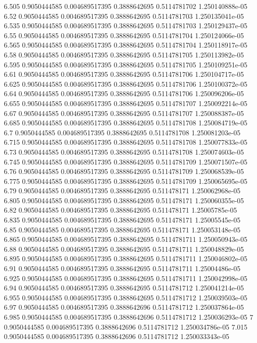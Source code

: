 {6.505 0.9050444585 0.004689517395 0.3888642695 0.5114781702 1.250140888e-05
6.52 0.9050444585 0.004689517395 0.3888642695 0.5114781703 1.250135041e-05
6.535 0.9050444585 0.004689517395 0.3888642695 0.5114781703 1.250129437e-05
6.55 0.9050444585 0.004689517395 0.3888642695 0.5114781704 1.250124066e-05
6.565 0.9050444585 0.004689517395 0.3888642695 0.5114781704 1.250118917e-05
6.58 0.9050444585 0.004689517395 0.3888642695 0.5114781705 1.250113982e-05
6.595 0.9050444585 0.004689517395 0.3888642695 0.5114781705 1.250109251e-05
6.61 0.9050444585 0.004689517395 0.3888642695 0.5114781706 1.250104717e-05
6.625 0.9050444585 0.004689517395 0.3888642695 0.5114781706 1.250100372e-05
6.64 0.9050444585 0.004689517395 0.3888642695 0.5114781706 1.250096206e-05
6.655 0.9050444585 0.004689517395 0.3888642695 0.5114781707 1.250092214e-05
6.67 0.9050444585 0.004689517395 0.3888642695 0.5114781707 1.250088387e-05
6.685 0.9050444585 0.004689517395 0.3888642695 0.5114781708 1.250084719e-05
6.7 0.9050444585 0.004689517395 0.3888642695 0.5114781708 1.250081203e-05
6.715 0.9050444585 0.004689517395 0.3888642695 0.5114781708 1.250077833e-05
6.73 0.9050444585 0.004689517395 0.3888642695 0.5114781708 1.250074603e-05
6.745 0.9050444585 0.004689517395 0.3888642695 0.5114781709 1.250071507e-05
6.76 0.9050444585 0.004689517395 0.3888642695 0.5114781709 1.250068539e-05
6.775 0.9050444585 0.004689517395 0.3888642695 0.5114781709 1.250065695e-05
6.79 0.9050444585 0.004689517395 0.3888642695 0.511478171 1.250062968e-05
6.805 0.9050444585 0.004689517395 0.3888642695 0.511478171 1.250060355e-05
6.82 0.9050444585 0.004689517395 0.3888642695 0.511478171 1.25005785e-05
6.835 0.9050444585 0.004689517395 0.3888642695 0.511478171 1.25005545e-05
6.85 0.9050444585 0.004689517395 0.3888642695 0.511478171 1.250053148e-05
6.865 0.9050444585 0.004689517395 0.3888642695 0.5114781711 1.250050943e-05
6.88 0.9050444585 0.004689517395 0.3888642695 0.5114781711 1.250048829e-05
6.895 0.9050444585 0.004689517395 0.3888642695 0.5114781711 1.250046802e-05
6.91 0.9050444585 0.004689517395 0.3888642695 0.5114781711 1.25004486e-05
6.925 0.9050444585 0.004689517395 0.3888642695 0.5114781711 1.250042998e-05
6.94 0.9050444585 0.004689517395 0.3888642695 0.5114781712 1.250041214e-05
6.955 0.9050444585 0.004689517395 0.3888642695 0.5114781712 1.250039503e-05
6.97 0.9050444585 0.004689517395 0.3888642696 0.5114781712 1.250037864e-05
6.985 0.9050444585 0.004689517395 0.3888642696 0.5114781712 1.250036293e-05
7 0.9050444585 0.004689517395 0.3888642696 0.5114781712 1.250034786e-05
7.015 0.9050444585 0.004689517395 0.3888642696 0.5114781712 1.250033343e-05
}
